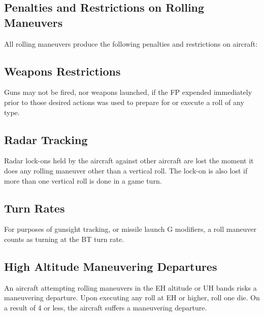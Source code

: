 \label{rule:sustained-rolling-maneuvers}

\subsection{Penalties and Restrictions on Rolling Maneuvers}

All rolling maneuvers produce the following penalties and restrictions on aircraft:


\subsection{Weapons Restrictions} Guns may not be fired, nor weapons launched, if the FP expended immediately prior to those desired actions was used to prepare for or execute a roll of any type.

\subsection{Radar Tracking} Radar lock-ons held by the aircraft against other aircraft are lost the moment it does any rolling maneuver other than a vertical roll. The lock-on is also lost if more than one vertical roll is done in a game turn.

\subsection{Turn Rates} For purposes of gunsight tracking, or missile launch G modifiers, a roll maneuver counts as turning at the BT turn rate.

\subsection{High Altitude Maneuvering Departures} An aircraft attempting rolling maneuvers in the EH altitude or UH bands risks a maneuvering departure. Upon executing any roll at EH or higher, roll one die. On a result of 4 or less, the aircraft suffers a maneuvering departure.

